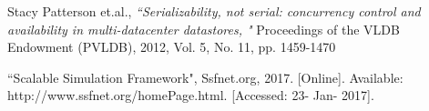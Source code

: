\begin{thebibliography}{9}

Stacy Patterson et.al., \emph{``Serializability, not serial: concurrency control and availability in multi-datacenter datastores, "} Proceedings of the VLDB Endowment (PVLDB), 2012, Vol. 5, No. 11, pp. 1459-1470

``Scalable Simulation Framework", Ssfnet.org, 2017. [Online]. Available: http://www.ssfnet.org/homePage.html. [Accessed: 23- Jan- 2017].
\end{thebibliography}